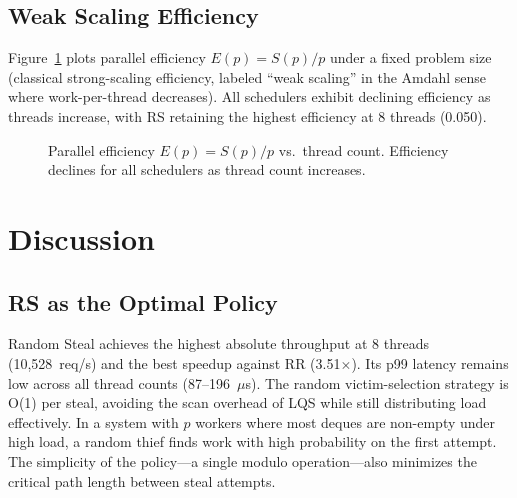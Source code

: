 \documentclass[conference]{IEEEtran}
\begin{document}
\subsection{Weak Scaling Efficiency}

Figure~\ref{fig:weak} plots parallel efficiency $E(p) = S(p)/p$ under a fixed problem size (classical strong-scaling efficiency, labeled ``weak scaling'' in the Amdahl sense where work-per-thread decreases). All schedulers exhibit declining efficiency as threads increase, with RS retaining the highest efficiency at 8 threads (0.050).

\begin{figure}[htbp]
\centering
{}
\caption{Parallel efficiency $E(p) = S(p)/p$ vs.\ thread count. Efficiency declines for all schedulers as thread count increases.}
\label{fig:weak}
\end{figure}

\section{Discussion}

\subsection{RS as the Optimal Policy}

Random Steal achieves the highest absolute throughput at 8 threads (10,528~req/s) and the best speedup against RR (3.51$\times$). Its p99 latency remains low across all thread counts (87--196~$\mu$s). The random victim-selection strategy is O(1) per steal, avoiding the scan overhead of LQS while still distributing load effectively. In a system with $p$ workers where most deques are non-empty under high load, a random thief finds work with high probability on the first attempt. The simplicity of the policy---a single modulo operation---also minimizes the critical path length between steal attempts.
\end{document}

